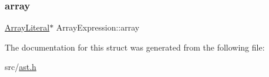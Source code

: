 \subsubsection{\texorpdfstring{array}{array}}
{\footnotesize\ttfamily \hyperlink{struct_array_literal}{Array\+Literal}$\ast$ Array\+Expression\+::array}



The documentation for this struct was generated from the following file\+:\begin{DoxyCompactItemize}
\item 
src/\hyperlink{ast_8h}{ast.\+h}\end{DoxyCompactItemize}
